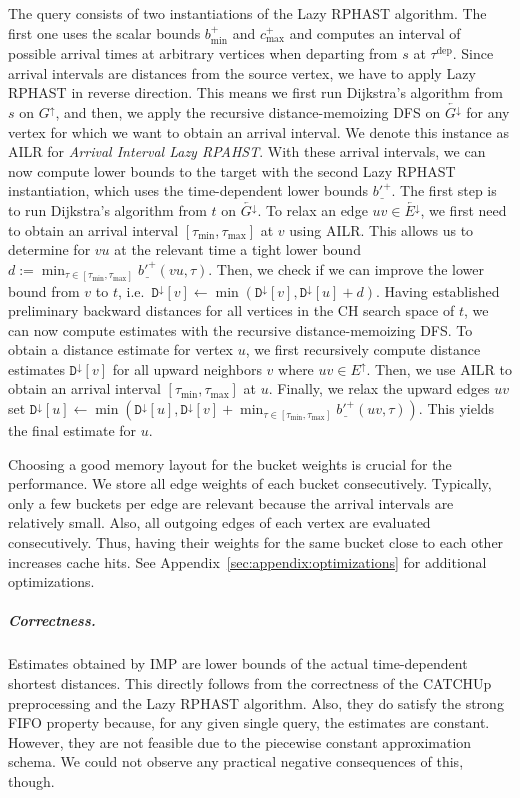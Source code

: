\documentclass[a4paper,UKenglish,cleveref, autoref, thm-restate]{lipics-v2021}
\newcommand*{\comb}{c}
\newcommand*{\tdep}{\tau^{\operatorname{dep}}}
\newcommand*{\gchu}{G^{\uparrow}}
\newcommand*{\gchd}{\overleftarrow{G^{\downarrow}}}
\newcommand*{\echu}{E^{\uparrow}}
\newcommand*{\rechd}{\overleftarrow{E^{\downarrow}}}
\newcommand*{\pcfn}{\underline{b'^+}}
\begin{document}
The query consists of two instantiations of the Lazy RPHAST algorithm.
The first one uses the scalar bounds $b^+_{\min}$ and $\comb^+_{\max}$ and computes an interval of possible arrival times at arbitrary vertices when departing from $s$ at $\tdep$.
Since arrival intervals are distances from the source vertex, we have to apply Lazy RPHAST in reverse direction.
This means we first run Dijkstra's algorithm from $s$ on $\gchu$, and then, we apply the recursive distance-memoizing DFS on $\gchd$ for any vertex for which we want to obtain an arrival interval.
We denote this instance as AILR for \emph{Arrival Interval Lazy RPAHST}.
With these arrival intervals, we can now compute lower bounds to the target with the second Lazy RPHAST instantiation, which uses the time-dependent lower bounds $\pcfn$.
The first step is to run Dijkstra's algorithm from $t$ on $\gchd$.
To relax an edge $uv \in \rechd$, we first need to obtain an arrival interval $[\tau_{\min}, \tau_{\max}]$ at $v$ using AILR.
This allows us to determine for $vu$ at the relevant time a tight lower bound $d := \min_{\tau \in [\tau_{\min}, \tau_{\max}]} \pcfn(vu, \tau)$.
Then, we check if we can improve the lower bound from $v$ to $t$, i.e.\ $\mathtt{D}^{\downarrow}[v] \leftarrow \min(\mathtt{D}^{\downarrow}[v], \mathtt{D}^{\downarrow}[u] + d)$.
Having established preliminary backward distances for all vertices in the CH search space of $t$, we can now compute estimates with the recursive distance-memoizing DFS.
To obtain a distance estimate for vertex $u$, we first recursively compute distance estimates $\mathtt{D}^{\downarrow}[v]$ for all upward neighbors $v$ where $uv \in \echu$.
Then, we use AILR to obtain an arrival interval $[\tau_{\min}, \tau_{\max}]$ at $u$.
Finally, we relax the upward edges $uv$ set $\mathtt{D}^{\downarrow}[u] \leftarrow \min(\mathtt{D}^{\downarrow}[u], \mathtt{D}^{\downarrow}[v] + \min_{\tau \in [\tau_{\min}, \tau_{\max}]} \pcfn(uv, \tau))$.
This yields the final estimate for $u$.

Choosing a good memory layout for the bucket weights is crucial for the performance.
We store all edge weights of each bucket consecutively.
Typically, only a few buckets per edge are relevant because the arrival intervals are relatively small.
Also, all outgoing edges of each vertex are evaluated consecutively.
Thus, having their weights for the same bucket close to each other increases cache hits.
See Appendix~\ref{sec:appendix:optimizations} for additional optimizations.

\subparagraph{Correctness.}
Estimates obtained by IMP are lower bounds of the actual time-dependent shortest distances.
This directly follows from the correctness of the CATCHUp preprocessing and the Lazy RPHAST algorithm.
Also, they do satisfy the strong FIFO property because, for any given single query, the estimates are constant.
However, they are not feasible due to the piecewise constant approximation schema.
We could not observe any practical negative consequences of this, though.
\end{document}
